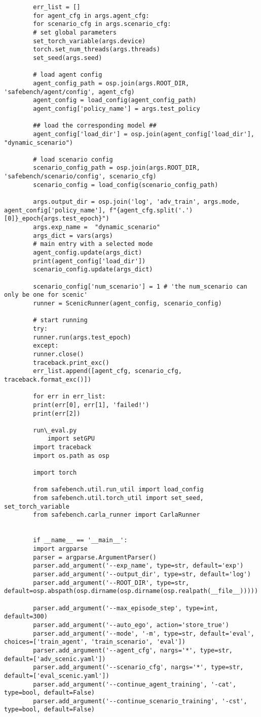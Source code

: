 \begin{lstlisting}
		err_list = []
		for agent_cfg in args.agent_cfg:
		for scenario_cfg in args.scenario_cfg:
		# set global parameters
		set_torch_variable(args.device)
		torch.set_num_threads(args.threads)
		set_seed(args.seed)
		
		# load agent config
		agent_config_path = osp.join(args.ROOT_DIR, 'safebench/agent/config', agent_cfg)
		agent_config = load_config(agent_config_path)
		agent_config['policy_name'] = args.test_policy
		
		## load the corresponding model ##
		agent_config['load_dir'] = osp.join(agent_config['load_dir'], "dynamic_scenario")
		
		# load scenario config
		scenario_config_path = osp.join(args.ROOT_DIR, 'safebench/scenario/config', scenario_cfg)
		scenario_config = load_config(scenario_config_path)
		
		args.output_dir = osp.join('log', 'adv_train', args.mode, agent_config['policy_name'], f"{agent_cfg.split('.')[0]}_epoch{args.test_epoch}")
		args.exp_name =  "dynamic_scenario"
		args_dict = vars(args)
		# main entry with a selected mode
		agent_config.update(args_dict)
		print(agent_config['load_dir'])
		scenario_config.update(args_dict)
		
		scenario_config['num_scenario'] = 1 # 'the num_scenario can only be one for scenic'
		runner = ScenicRunner(agent_config, scenario_config)
		
		# start running
		try:
		runner.run(args.test_epoch)
		except:
		runner.close()
		traceback.print_exc()
		err_list.append([agent_cfg, scenario_cfg, traceback.format_exc()])
		
		for err in err_list:
		print(err[0], err[1], 'failed!')
		print(err[2])
		
		run\_eval.py
			import setGPU
		import traceback
		import os.path as osp
		
		import torch 
		
		from safebench.util.run_util import load_config
		from safebench.util.torch_util import set_seed, set_torch_variable
		from safebench.carla_runner import CarlaRunner
		
		
		if __name__ == '__main__':
		import argparse
		parser = argparse.ArgumentParser()
		parser.add_argument('--exp_name', type=str, default='exp')
		parser.add_argument('--output_dir', type=str, default='log')
		parser.add_argument('--ROOT_DIR', type=str, default=osp.abspath(osp.dirname(osp.dirname(osp.realpath(__file__)))))
		
		parser.add_argument('--max_episode_step', type=int, default=300)
		parser.add_argument('--auto_ego', action='store_true')
		parser.add_argument('--mode', '-m', type=str, default='eval', choices=['train_agent', 'train_scenario', 'eval'])
		parser.add_argument('--agent_cfg', nargs='*', type=str, default=['adv_scenic.yaml'])
		parser.add_argument('--scenario_cfg', nargs='*', type=str, default=['eval_scenic.yaml'])
		parser.add_argument('--continue_agent_training', '-cat', type=bool, default=False)
		parser.add_argument('--continue_scenario_training', '-cst', type=bool, default=False)
		

\end{lstlisting}
